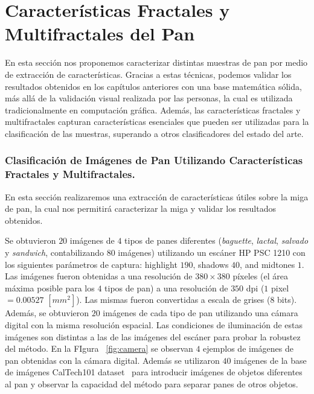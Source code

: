 \documentclass[spanish,a4paper,11pt,oneside,links]{report}
\begin{document}
\chapter{Características Fractales y Multifractales del Pan}
En esta sección nos proponemos caracterizar distintas muestras de pan por medio de extracción de características.
Gracias a estas t\'ecnicas, podemos validar los resultados obtenidos en los cap\'itulos anteriores con una base matem\'atica s\'olida, m\'as all\'a de la validaci\'on visual realizada por las personas, la cual es utilizada tradicionalmente en computaci\'on gr\'afica.
Además, las características fractales y multifractales capturan características esenciales que pueden ser utilizadas para la clasificación de las muestras, superando a otros clasificadores del estado del arte.



\subsection{Clasificación de Imágenes de Pan Utilizando Características Fractales y Multifractales.}



En esta sección realizaremos una extracción de características útiles sobre la miga de pan, la cual nos permitirá caracterizar la miga y validar los resultados obtenidos.


Se obtuvieron $20$ imágenes de $4$ tipos de panes diferentes ({\em baguette}, {\em lactal}, {\em salvado} y {\em sandwich}, contabilizando $80$ imágenes) utilizando un escáner HP PSC 1210 con los siguientes parámetros de captura:  highlight $190$, shadows $40$, and midtones $1$. Las imágenes fueron obtenidas a una resolución de $380\times 380$ píxeles (el área máxima posible para los $4$ tipos de pan) a una resolución de $350$ dpi ($1$ pixel $= 0.00527$ $[mm^{2}]$). Las mismas fueron convertidas a escala de grises ($8$ bits). Además, se obtuvieron $20$ imágenes de cada tipo de pan utilizando una cámara digital con la misma resolución espacial. Las condiciones de iluminación de estas imágenes son distintas a las de las imágenes del escáner para probar la robustez del método. En la FIgura ~\ref{fig:camera} se observan $4$ ejemplos de imágenes de pan obtenidas con la cámara digital. Además se utilizaron $40$ imágenes de la base de imágenes CalTech101 dataset~\cite{FeiFei04} para introducir imágenes de objetos diferentes al pan y observar la capacidad del método para separar panes de otros objetos.
\end{document}
